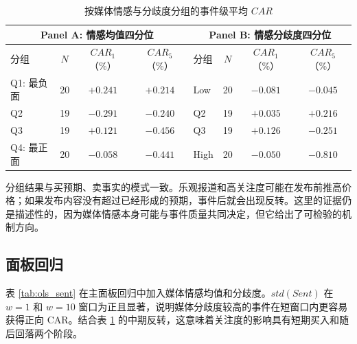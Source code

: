 \documentclass[11pt,fontset=fandol]{ctexart}
\begin{document}
\begin{table}[htbp]
\centering
\caption{按媒体情感与分歧度分组的事件级平均 $CAR$}
\label{tab:sent_q}
\small
\begin{tabular}{lccc|lccc}
\toprule
\multicolumn{4}{c|}{Panel A: 情感均值四分位} & \multicolumn{4}{c}{Panel B: 情感分歧度四分位} \\
\midrule
分组 & $N$ & $CAR_{1}$（\%） & $CAR_{5}$（\%） & 分组 & $N$ & $CAR_{1}$（\%） & $CAR_{5}$（\%） \\
\midrule
Q1: 最负面 & 20 & $+0.241$ & $+0.214$ & Low & 20 & $-0.081$ & $-0.045$ \\
Q2         & 19 & $-0.291$ & $-0.240$ & Q2  & 19 & $+0.035$ & $+0.216$ \\
Q3         & 19 & $+0.121$ & $-0.456$ & Q3  & 19 & $+0.126$ & $-0.251$ \\
Q4: 最正面 & 20 & $-0.058$ & $-0.441$ & High & 20 & $-0.050$ & $-0.810$ \\
\bottomrule
\end{tabular}
\end{table}

分组结果与买预期、卖事实的模式一致。乐观报道和高关注度可能在发布前推高价格；如果发布内容没有超过已经形成的预期，事件后就会出现反转。这里的证据仍是描述性的，因为媒体情感本身可能与事件质量共同决定，但它给出了可检验的机制方向。

\subsection{面板回归}

表 \ref{tab:ols_sent} 在主面板回归中加入媒体情感均值和分歧度。$std(Sent)$ 在 $w=1$ 和 $w=10$ 窗口为正且显著，说明媒体分歧度较高的事件在短窗口内更容易获得正向 CAR。结合表 \ref{tab:sent_q} 的中期反转，这意味着关注度的影响具有短期买入和随后回落两个阶段。
\end{document}
